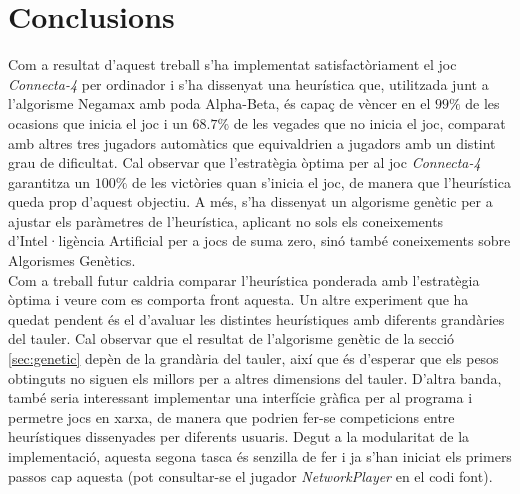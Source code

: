 \documentclass[12pt,a4paper]{article}
\begin{document}
\section{Conclusions}
Com a resultat d'aquest treball s'ha implementat satisfactòriament el joc \emph{Connecta-4} per ordinador i s'ha dissenyat una heurística que, utilitzada junt a l'algorisme Negamax amb poda Alpha-Beta, és capaç de vèncer en el $99\%$ de les ocasions que inicia el joc i un $68.7\%$ de les vegades que no inicia el joc, comparat amb altres tres jugadors automàtics que equivaldrien a jugadors amb un distint grau de dificultat. Cal observar que l'estratègia òptima per al joc \emph{Connecta-4} garantitza un $100\%$ de les victòries quan s'inicia el joc\cite{allis1988knowledge}, de manera que l'heurística queda prop d'aquest objectiu. A més, s'ha dissenyat un algorisme genètic per a ajustar els paràmetres de l'heurística, aplicant no sols els coneixements d'Intel·ligència Artificial per a jocs de suma zero, sinó també coneixements sobre Algorismes Genètics.\\

Com a treball futur caldria comparar l'heurística ponderada amb l'estratègia òptima i veure com es comporta front aquesta. Un altre experiment que ha quedat pendent és el d'avaluar les distintes heurístiques amb diferents grandàries del tauler. Cal observar que el resultat de l'algorisme genètic de la secció \ref{sec:genetic} depèn de la grandària del tauler, així que és d'esperar que els pesos obtinguts no siguen els millors per a altres dimensions del tauler. D'altra banda, també seria interessant implementar una interfície gràfica per al programa i permetre jocs en xarxa, de manera que podrien fer-se competicions entre heurístiques dissenyades per diferents usuaris. Degut a la modularitat de la implementació, aquesta segona tasca és senzilla de fer i ja s'han iniciat els primers passos cap aquesta (pot consultar-se el jugador \emph{NetworkPlayer} en el codi font).

 

\end{document}
